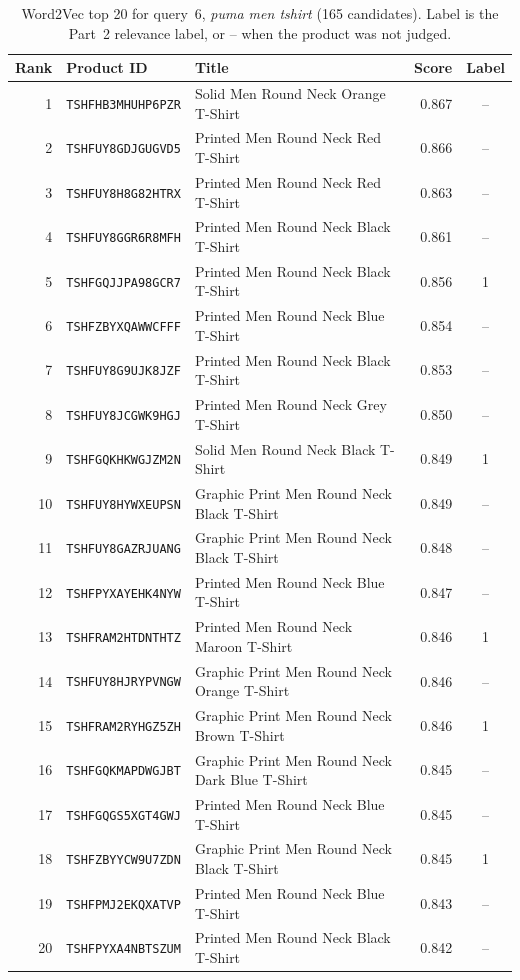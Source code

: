 \documentclass[11pt,a4paper]{article}
\begin{document}
\begin{table}[htbp]
  \centering
  \small
  \caption{Word2Vec top 20 for query~6, \emph{puma men tshirt} (165 candidates). Label is
  the Part~2 relevance label, or -- when the product was not judged.}
  \label{tab:w2v-q6}
  \begin{tabular}{rlp{7.2cm}rc}
    \toprule
    Rank & Product ID & Title & Score & Label \\
    \midrule
    1 & \texttt{TSHFHB3MHUHP6PZR} & Solid Men Round Neck Orange T-Shirt & 0.867 & -- \\
    2 & \texttt{TSHFUY8GDJGUGVD5} & Printed Men Round Neck Red T-Shirt & 0.866 & -- \\
    3 & \texttt{TSHFUY8H8G82HTRX} & Printed Men Round Neck Red T-Shirt & 0.863 & -- \\
    4 & \texttt{TSHFUY8GGR6R8MFH} & Printed Men Round Neck Black T-Shirt & 0.861 & -- \\
    5 & \texttt{TSHFGQJJPA98GCR7} & Printed Men Round Neck Black T-Shirt & 0.856 & 1 \\
    6 & \texttt{TSHFZBYXQAWWCFFF} & Printed Men Round Neck Blue T-Shirt & 0.854 & -- \\
    7 & \texttt{TSHFUY8G9UJK8JZF} & Printed Men Round Neck Black T-Shirt & 0.853 & -- \\
    8 & \texttt{TSHFUY8JCGWK9HGJ} & Printed Men Round Neck Grey T-Shirt & 0.850 & -- \\
    9 & \texttt{TSHFGQKHKWGJZM2N} & Solid Men Round Neck Black T-Shirt & 0.849 & 1 \\
    10 & \texttt{TSHFUY8HYWXEUPSN} & Graphic Print Men Round Neck Black T-Shirt & 0.849 & -- \\
    11 & \texttt{TSHFUY8GAZRJUANG} & Graphic Print Men Round Neck Black T-Shirt & 0.848 & -- \\
    12 & \texttt{TSHFPYXAYEHK4NYW} & Printed Men Round Neck Blue T-Shirt & 0.847 & -- \\
    13 & \texttt{TSHFRAM2HTDNTHTZ} & Printed Men Round Neck Maroon T-Shirt & 0.846 & 1 \\
    14 & \texttt{TSHFUY8HJRYPVNGW} & Graphic Print Men Round Neck Orange T-Shirt & 0.846 & -- \\
    15 & \texttt{TSHFRAM2RYHGZ5ZH} & Graphic Print Men Round Neck Brown T-Shirt & 0.846 & 1 \\
    16 & \texttt{TSHFGQKMAPDWGJBT} & Graphic Print Men Round Neck Dark Blue T-Shirt & 0.845 & -- \\
    17 & \texttt{TSHFGQGS5XGT4GWJ} & Printed Men Round Neck Blue T-Shirt & 0.845 & -- \\
    18 & \texttt{TSHFZBYYCW9U7ZDN} & Graphic Print Men Round Neck Black T-Shirt & 0.845 & 1 \\
    19 & \texttt{TSHFPMJ2EKQXATVP} & Printed Men Round Neck Blue T-Shirt & 0.843 & -- \\
    20 & \texttt{TSHFPYXA4NBTSZUM} & Printed Men Round Neck Black T-Shirt & 0.842 & -- \\
    \bottomrule
  \end{tabular}
\end{table}
\end{document}
